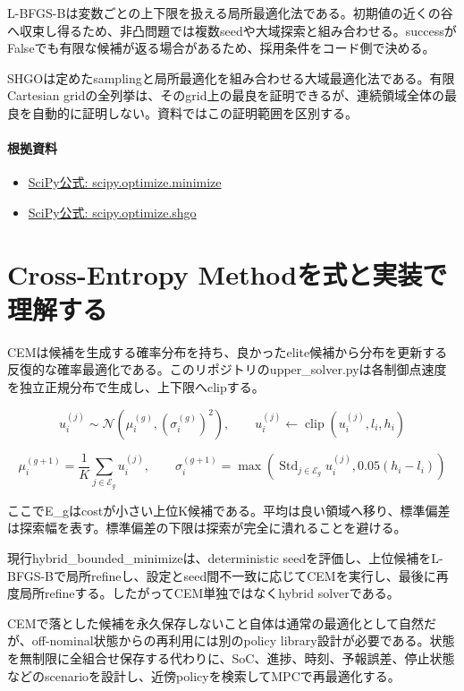 \documentclass[a4paper,11pt]{article}
\begin{document}
L-BFGS-Bは変数ごとの上下限を扱える局所最適化法である。初期値の近くの谷へ収束し得るため、非凸問題では複数seedや大域探索と組み合わせる。successがFalseでも有限な候補が返る場合があるため、採用条件をコード側で決める。


SHGOは定めたsamplingと局所最適化を組み合わせる大域最適化法である。有限Cartesian gridの全列挙は、そのgrid上の最良を証明できるが、連続領域全体の最良を自動的に証明しない。資料ではこの証明範囲を区別する。

\paragraph{根拠資料}
\begin{itemize}[leftmargin=1.6em]
\item \href{https://docs.scipy.org/doc/scipy/reference/generated/scipy.optimize.minimize.html}{SciPy公式: scipy.optimize.minimize}
\item \href{https://docs.scipy.org/doc/scipy/reference/generated/scipy.optimize.shgo.html}{SciPy公式: scipy.optimize.shgo}
\end{itemize}

\section{Cross-Entropy Methodを式と実装で理解する}
CEMは候補を生成する確率分布を持ち、良かったelite候補から分布を更新する反復的な確率最適化である。このリポジトリのupper\_solver.pyは各制御点速度を独立正規分布で生成し、上下限へclipする。


\[
u_i^{(j)} \sim \mathcal{N}(\mu_i^{(g)},(\sigma_i^{(g)})^2),\qquad u_i^{(j)}\leftarrow\operatorname{clip}(u_i^{(j)},l_i,h_i)
\]

\[
\mu_i^{(g+1)}=\frac{1}{K}\sum_{j\in\mathcal{E}_g}u_i^{(j)},\qquad \sigma_i^{(g+1)}=\max\left(\operatorname{Std}_{j\in\mathcal{E}_g}u_i^{(j)},0.05(h_i-l_i)\right)
\]

ここでE\_gはcostが小さい上位K候補である。平均は良い領域へ移り、標準偏差は探索幅を表す。標準偏差の下限は探索が完全に潰れることを避ける。


現行hybrid\_bounded\_minimizeは、deterministic seedを評価し、上位候補をL-BFGS-Bで局所refineし、設定とseed間不一致に応じてCEMを実行し、最後に再度局所refineする。したがってCEM単独ではなくhybrid solverである。


CEMで落とした候補を永久保存しないこと自体は通常の最適化として自然だが、off-nominal状態からの再利用には別のpolicy library設計が必要である。状態を無制限に全組合せ保存する代わりに、SoC、進捗、時刻、予報誤差、停止状態などのscenarioを設計し、近傍policyを検索してMPCで再最適化する。
\end{document}
